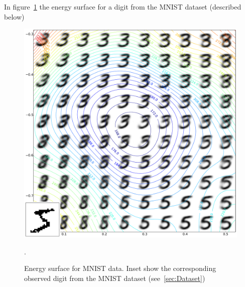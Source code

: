 \begin{appendices}
In figure~\ref{fig:EnergySurfaceMNIST} the energy surface for a digit from the MNIST dataset (described below)

\begin{figure}
\centering
\includegraphics[width=\columnwidth]{figures/vae_pot_energy_example.pdf}
\caption{Energy surface for MNIST data. Inset show the corresponding observed digit from the MNIST dataset (see~\ref{sec:Dataset})}.
\label{fig:EnergySurfaceMNIST}
\end{figure}


\end{appendices}